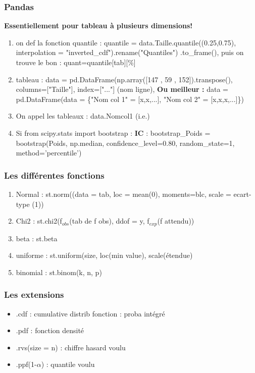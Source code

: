 \documentclass[../main.tex]{subfiles}
\begin{document}
\subsubsection{Pandas}
\quad \textbf{Essentiellement pour tableau à plusieurs dimensions!}
\begin{enumerate}
    \item on def la fonction quantile : quantile = data.Taille.quantile((0.25,0.75), interpolation = "inverted\_cdf").rename("Quantiles") .to\_frame(), puis on trouve le bon : quant=quantile[tab][\%]\\
    \item tableau : data = pd.DataFrame(np.array([147 , 59 , 152]).transpose(), 
                     columns=["Taille"], index=["..."] (nom ligne), \textbf{Ou meilleur :}
                     data = pd.DataFrame(data = \{"Nom col 1" = [x,x,...], "Nom col 2" = [x,x,x,...]\})\\
    \item On appel les tableaux : data.Nomcol1 (i.e.)
    \item Si from scipy.stats import bootstrap : \textbf{IC} : bootstrap\_Poids = bootstrap(Poids, np.median, confidence\_level=0.80,
                         random\_state=1, method='percentile')\\
\end{enumerate}

\subsubsection{Les différentes fonctions}
\begin{enumerate}
    \item Normal : st.norm((data = tab, loc = mean(0), moments=blc, scale = ecart-type (1))\\
    \item Chi2 : st.chi2(f$_{obs}$(tab de f obs), ddof = y, f$_{exp}$(f attendu))\\
    \item beta : st.beta\\
    \item uniforme : st.uniform(size, loc(min value), scale(étendue)\\
    \item binomial : st.binom(k, n, p)\\
\end{enumerate}

\subsubsection{Les extensions}
\begin{itemize}
    \item .cdf : cumulative distrib fonction : proba intégré\\
    \item .pdf : fonction densité\\
    \item .rvs(size = n) : chiffre hasard voulu\\
    \item .ppf(1-$\alpha$) : quantile voulu\\
\end{itemize}
\end{document}
